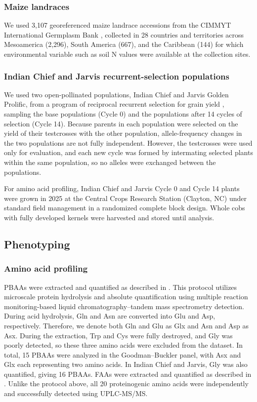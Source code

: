 \documentclass[namedate,unnumsec,webpdf,contemporary,large]{oup-authoring-template}
\begin{document}
\subsubsection{Maize landraces}
We used 3,107 georeferenced maize landrace accessions from the CIMMYT International Germplasm Bank \citep{RomeroNavarro2017Landraces}, collected in 28 countries and territories across Mesoamerica (2,296), South America (667), and the Caribbean (144) for which environmental variable such as soil N values were available at the collection sites.

\subsubsection{Indian Chief and Jarvis recurrent-selection populations}
We used two open-pollinated populations, Indian Chief and Jarvis Golden Prolific, from a program of reciprocal recurrent selection for grain yield \citep{MollStuber1971,Moll1994}, sampling the base populations (Cycle 0) and the populations after 14 cycles of selection (Cycle 14). Because parents in each population were selected on the yield of their testcrosses with the other population, allele-frequency changes in the two populations are not fully independent. However, the testcrosses were used only for evaluation, and each new cycle was formed by intermating selected plants within the same population, so no alleles were exchanged between the populations.

For amino acid profiling, Indian Chief and Jarvis Cycle 0 and Cycle 14 plants were grown in 2025 at the Central Crops Research Station (Clayton, NC) under standard field management in a randomized complete block design. Whole cobs with fully developed kernels were harvested and stored until analysis.

\subsection{Phenotyping}

\subsubsection{Amino acid profiling}
PBAAs were extracted and quantified as described in \cite{Yobi2018PBAA}. This protocol utilizes microscale protein hydrolysis and absolute quantification using multiple reaction monitoring-based liquid chromatography–tandem mass spectrometry detection. During acid hydrolysis, Gln and Asn are converted into Glu and Asp, respectively. Therefore, we denote both Gln and Glu as Glx and Asn and Asp as Asx. During the extraction, Trp and Cys were fully destroyed, and Gly was poorly detected, so these three amino acids were excluded from the dataset. In total, 15 PBAAs were analyzed in the Goodman--Buckler panel, with Asx and Glx each representing two amino acids. In Indian Chief and Jarvis, Gly was also quantified, giving 16 PBAAs. FAAs were extracted and quantified as described in \citet{Gu2007LCMS}. Unlike the protocol above, all 20 proteinogenic amino acids were independently and successfully detected using UPLC-MS/MS.
\end{document}
